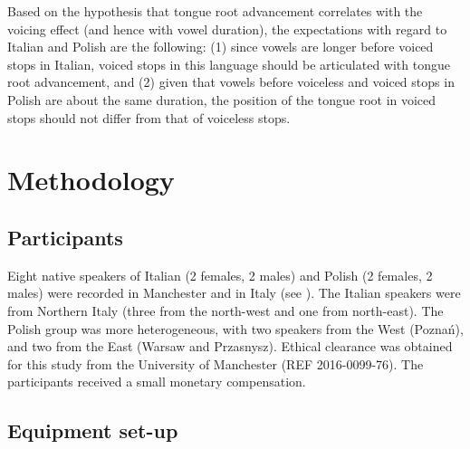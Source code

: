 \documentclass[authoryear, twocolumn]{elsarticle}
\begin{document}
Based on the hypothesis that tongue root advancement correlates with the
voicing effect (and hence with vowel duration), the expectations with
regard to Italian and Polish are the following: (1) since vowels are
longer before voiced stops in Italian, voiced stops in this language
should be articulated with tongue root advancement, and (2) given that
vowels before voiceless and voiced stops in Polish are about the same
duration, the position of the tongue root in voiced stops should not
differ from that of voiceless stops.

\section{Methodology}\label{methodology}

\subsection{Participants}\label{participants}


Eight native speakers of Italian (2 females, 2 males) and Polish (2
females, 2 males) were recorded in Manchester and in Italy (see
). The Italian speakers were from Northern Italy
(three from the north-west and one from north-east). The Polish group
was more heterogeneous, with two speakers from the West (Poznań), and
two from the East (Warsaw and Przasnysz). Ethical clearance was obtained
for this study from the University of Manchester (REF 2016-0099-76). The
participants received a small monetary compensation.

\subsection{Equipment set-up}\label{equipment-set-up}
\end{document}
